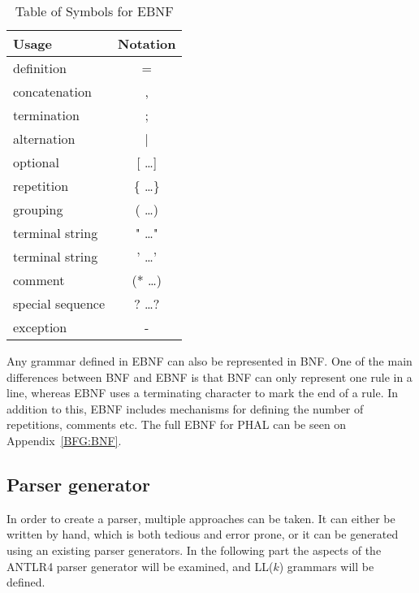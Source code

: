 \begin{table}[H]
\centering
\begin{tabular}{@{}lc@{}}
\toprule
\textbf{Usage}   & \multicolumn{1}{l}{\textbf{Notation}} \\ \midrule
definition       & =                                     \\
concatenation    & ,                                     \\
termination      & ;                                     \\
alternation      & |                                     \\
optional         & [ \dots ]                             \\
repetition       & \{ \dots \}                           \\
grouping         & ( \dots )                             \\
terminal string  & " \dots "                             \\
terminal string  & ' \dots '                             \\
comment          & (* \dots *)                           \\
special sequence & ? \dots ?                             \\
exception        & -                                     \\\bottomrule
\end{tabular}
\caption{Table of Symbols for EBNF}
\label{table:ebnf}
\end{table}
\noindent
Any grammar defined in EBNF can also be represented in BNF. One of the main differences between BNF and EBNF is that BNF can only represent one rule in a line, whereas EBNF uses a terminating character to mark the end of a rule. In addition to this, EBNF includes mechanisms for defining the number of repetitions, comments etc.
The full EBNF for PHAL can be seen on Appendix~\ref{BFG:BNF}.

\subsection{Parser generator}
In order to create a parser, multiple approaches can be taken. It can either be written by hand, which is both tedious and error prone, or it can be generated using an existing parser generators. In the following part the aspects of the ANTLR4 parser generator will be examined, and LL($k$) grammars will be defined. 

